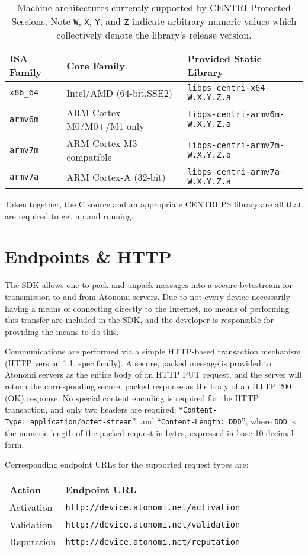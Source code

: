 \begin{table}[h]
\centering
\begin{tabular}{l l l}
	\textbf{ISA Family} & \textbf{Core Family} & \textbf{Provided Static Library} \\
	\hline
	\texttt{x86_64} & Intel/AMD (64-bit,SSE2)    & \texttt{libps-centri-x64-W.X.Y.Z.a} \\
	\texttt{armv6m} & ARM Cortex-M0/M0+/M1 only  & \texttt{libps-centri-armv6m-W.X.Y.Z.a} \\
	\texttt{armv7m} & ARM Cortex-M3-compatible   & \texttt{libps-centri-armv7m-W.X.Y.Z.a} \\
	\texttt{armv7a} & ARM Cortex-A (32-bit)      & \texttt{libps-centri-armv7a-W.X.Y.Z.a} \\
\end{tabular}
\caption{Machine architectures currently supported by CENTRI Protected Sessions.
	Note \texttt{W}, \texttt{X}, \texttt{Y}, and \texttt{Z} indicate
	arbitrary numeric values which collectively denote the library's
	release version.}
\label{t:libps_arches}
\end{table}

Taken together, the C source and an appropriate CENTRI PS library are
all that are required to get up and running.


\section{Endpoints \&{} HTTP}
The SDK allows one to pack and unpack messages into a secure bytestream
for transmission to and from Atonomi servers. Due to not every device
necessarily having a means of connecting directly to the Internet, no
means of performing this transfer are included in the SDK, and the developer
is responsible for providing the means to do this.

Communications are performed via a simple HTTP-based transaction mechanism
(HTTP version 1.1, specifically). A secure, packed message is provided to
Atonomi servers as the entire body of an HTTP PUT request, and the server
will return the corresponding secure, packed response as the body of an
HTTP 200 (OK) response. No special content encoding is required for the
HTTP transaction, and only two headers are required:
``\texttt{Content-Type:~application/octet-stream}'', and
``\texttt{Content-Length:~DDD}'', where \texttt{DDD} is the numeric length
of the packed request in bytes, expressed in base-10 decimal form.

Corresponding endpoint URLs for the supported request types are:

\begin{center}
\begin{tabular}{l l}
	\textbf{Action} & \textbf{Endpoint URL} \\
	\hline
	Activation & \texttt{http://device.atonomi.net/activation} \\
	Validation & \texttt{http://device.atonomi.net/validation} \\
	Reputation & \texttt{http://device.atonomi.net/reputation} \\
\end{tabular}
\end{center}


